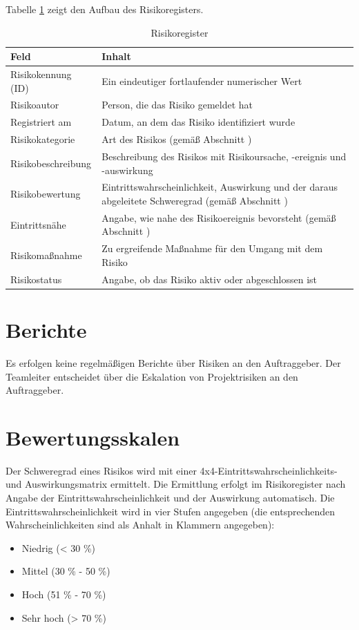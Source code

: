 \documentclass[a4paper,11pt,listof=numbered,glossary=totoc,parskip=half,toc=bib]{scrreprt}
\begin{document}
Tabelle \ref{tab:risikoregister} zeigt den Aufbau des Risikoregisters.

\begin{table}
\begin{tabularx}{\textwidth}{lX}
	\toprule
	Feld & Inhalt \\
	\midrule
	Risikokennung (ID) & Ein eindeutiger fortlaufender numerischer Wert \\
	 Risikoautor& Person, die das Risiko gemeldet hat \\
	 Registriert am& Datum, an dem das Risiko identifiziert wurde\\
	 Risikokategorie& Art des Risikos (gemäß Abschnitt \nameref{subsec:risikokategorien})\\
	 Risikobeschreibung& Beschreibung des Risikos mit Risikoursache, -ereignis und -auswirkung\\
	 Risikobewertung& Eintrittswahrscheinlichkeit, Auswirkung und der daraus abgeleitete Schweregrad (gemäß Abschnitt \nameref{subsec:bewertungsskalen})\\
	 Eintrittsnähe& Angabe, wie nahe des Risikoereignis bevorsteht (gemäß Abschnitt \nameref{subsec:eintrittsnaehe})\\
	 Risikomaßnahme& Zu ergreifende Maßnahme für den Umgang mit dem Risiko\\
	 Risikostatus& Angabe, ob das Risiko aktiv oder abgeschlossen ist\\
	 \bottomrule
	 
\end{tabularx}
\caption{Risikoregister}
\label{tab:risikoregister}
\end{table}
	
\section{Berichte}

Es erfolgen keine regelmäßigen Berichte über Risiken an den Auftraggeber. Der Teamleiter entscheidet über die Eskalation von Projektrisiken an den Auftraggeber.

\section{Bewertungsskalen}
\label{subsec:bewertungsskalen}

Der Schweregrad eines Risikos wird mit einer 4x4-Eintrittswahrscheinlichkeits- und Auswirkungsmatrix ermittelt. Die Ermittlung erfolgt im Risikoregister nach Angabe der Eintrittswahrscheinlichkeit und der Auswirkung automatisch.
Die Eintrittswahrscheinlichkeit wird in vier Stufen angegeben (die entsprechenden Wahrscheinlichkeiten sind als Anhalt in Klammern angegeben):
\begin{itemize}
	\item Niedrig (< 30 \%)
	\item Mittel (30 \% - 50 \%)
	\item Hoch (51 \% - 70 \%)
	\item Sehr hoch (> 70 \%)
\end{itemize}
\end{document}
